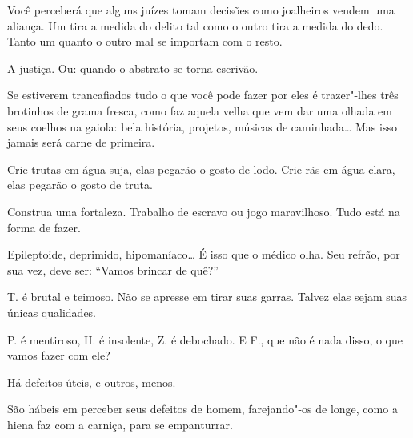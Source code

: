 \bigskip
\bigskip

Você perceberá que alguns juízes tomam decisões como joalheiros vendem
uma aliança. Um tira a medida do delito tal como o outro tira a medida
do dedo. Tanto um quanto o outro mal se importam com o resto.

\bigskip
\bigskip

A justiça. Ou: quando o abstrato se torna escrivão.

\bigskip
\bigskip

Se estiverem trancafiados tudo o que você pode fazer por eles é
trazer"-lhes três brotinhos de grama fresca, como faz aquela velha que
vem dar uma olhada em seus coelhos na gaiola: bela história, projetos,
músicas de caminhada\ldots{} Mas isso jamais será carne de primeira.

\bigskip
\bigskip

Crie trutas em água suja, elas pegarão o gosto de lodo. Crie rãs em água
clara, elas pegarão o gosto de truta.

\bigskip
\bigskip

Construa uma fortaleza. Trabalho de escravo ou jogo maravilhoso. Tudo
está na forma de fazer.

\bigskip
\bigskip

Epileptoide, deprimido, hipomaníaco\ldots{} É isso que o médico olha. Seu
refrão, por sua vez, deve ser: ``Vamos brincar de quê?''

\bigskip
\bigskip

T. é brutal e teimoso. Não se apresse em tirar suas garras. Talvez elas
sejam suas únicas qualidades.

\bigskip
\bigskip

P. é mentiroso, H. é insolente, Z. é debochado. E F., que não é nada
disso, o que vamos fazer com ele?

\bigskip
\bigskip

Há defeitos úteis, e outros, menos.

\bigskip
\bigskip

São hábeis em perceber seus defeitos de homem, farejando"-os de longe,
como a hiena faz com a carniça, para se empanturrar.

\bigskip
\bigskip

